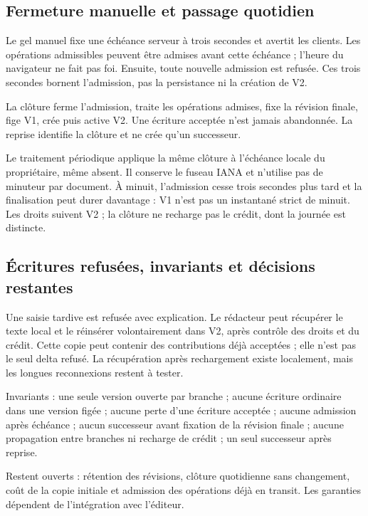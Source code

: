 \subsection{Fermeture manuelle et passage quotidien}


Le gel manuel fixe une échéance serveur à trois secondes et avertit les clients. Les opérations admissibles peuvent être admises avant cette échéance ; l'heure du navigateur ne fait pas foi. Ensuite, toute nouvelle admission est refusée. Ces trois secondes bornent l'admission, pas la persistance ni la création de V2.

La clôture ferme l'admission, traite les opérations admises, fixe la révision finale, fige V1, crée puis active V2. Une écriture acceptée n'est jamais abandonnée. La reprise identifie la clôture et ne crée qu'un successeur.

Le traitement périodique applique la même clôture à l'échéance locale du propriétaire, même absent. Il conserve le fuseau IANA et n'utilise pas de minuteur par document. À minuit, l'admission cesse trois secondes plus tard et la finalisation peut durer davantage : V1 n'est pas un instantané strict de minuit. Les droits suivent V2 ; la clôture ne recharge pas le crédit, dont la journée est distincte.

\subsection{Écritures refusées, invariants et décisions restantes}

Une saisie tardive est refusée avec explication. Le rédacteur peut récupérer le texte local et le réinsérer volontairement dans V2, après contrôle des droits et du crédit. Cette copie peut contenir des contributions déjà acceptées ; elle n'est pas le seul delta refusé. La récupération après rechargement existe localement, mais les longues reconnexions restent à tester.

Invariants : une seule version ouverte par branche ; aucune écriture ordinaire dans une version figée ; aucune perte d'une écriture acceptée ; aucune admission après échéance ; aucun successeur avant fixation de la révision finale ; aucune propagation entre branches ni recharge de crédit ; un seul successeur après reprise.

Restent ouverts : rétention des révisions, clôture quotidienne sans changement, coût de la copie initiale et admission des opérations déjà en transit. Les garanties dépendent de l'intégration avec l'éditeur.


